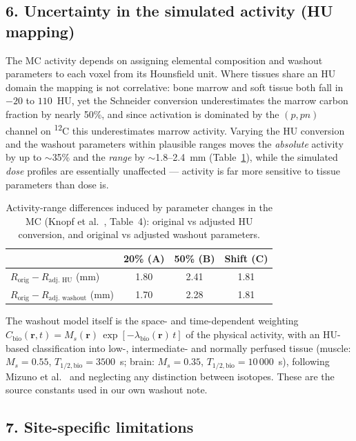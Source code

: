 \documentclass[11pt]{article}
\newcommand{\iso}[2]{\textsuperscript{#1}#2}
\begin{document}
\subsection*{6. Uncertainty in the simulated activity (HU mapping)}

The MC activity depends on assigning elemental composition and washout parameters
to each voxel from its Hounsfield unit. Where tissues share an HU domain the
mapping is not correlative: bone marrow and soft tissue both fall in
$-20$ to $110$~HU, yet the Schneider conversion underestimates the marrow carbon
fraction by nearly 50\%, and since activation is dominated by the $(p,pn)$ channel
on \iso{12}{C} this underestimates marrow activity. Varying the HU conversion and
the washout parameters within plausible ranges moves the \emph{absolute} activity
by up to $\sim$35\% and the \emph{range} by $\sim$1.8--2.4~mm
(Table~\ref{tab:hu}), while the simulated \emph{dose} profiles are essentially
unaffected --- activity is far more sensitive to tissue parameters than dose is.

\begin{table}[h]
  \centering
  \caption{Activity-range differences induced by parameter changes in the MC
    (Knopf et al.~\cite{knopf2009}, Table~4): original vs adjusted HU conversion,
    and original vs adjusted washout parameters.}
  \label{tab:hu}
  \begin{tabular}{lccc}
    \toprule
    & 20\% (A) & 50\% (B) & Shift (C) \\
    \midrule
    $R_{\text{orig}}-R_{\text{adj.\ HU}}$ (mm)      & 1.80 & 2.41 & 1.81 \\
    $R_{\text{orig}}-R_{\text{adj.\ washout}}$ (mm) & 1.70 & 2.28 & 1.81 \\
    \bottomrule
  \end{tabular}
\end{table}

\noindent
The washout model itself is the space- and time-dependent weighting
$C_{\mathrm{bio}}(\mathbf{r},t) = M_s(\mathbf{r})\,
\exp[-\lambda_{\mathrm{bio}}(\mathbf{r})\,t]$ of the physical activity, with an
HU-based classification into low-, intermediate- and normally perfused tissue
(muscle: $M_s=0.55$, $T_{1/2,\mathrm{bio}}=3500$~s; brain: $M_s=0.35$,
$T_{1/2,\mathrm{bio}}=10\,000$~s), following Mizuno et al.~\cite{mizuno2003} and
neglecting any distinction between isotopes. These are the source constants used
in our own washout note.

\subsection*{7. Site-specific limitations}
\end{document}
